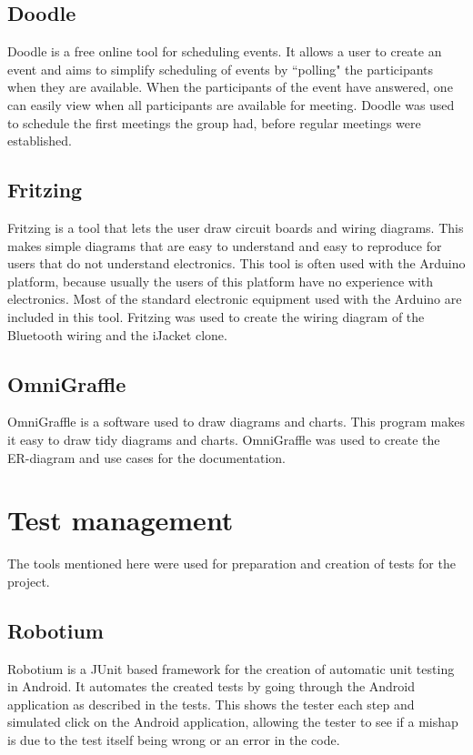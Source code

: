 \subsection{Doodle}
Doodle is a free online tool for scheduling events. It allows a user to create an event and aims to simplify scheduling of events by ``polling" the participants when they are available. When the participants of the event have answered, one can easily view when all participants are available for meeting. Doodle was used to schedule the first meetings the group had, before regular meetings were established.

\subsection{Fritzing}
Fritzing is a tool that lets the user draw circuit boards and wiring diagrams. This makes simple diagrams that are easy to understand and easy to reproduce for users that do not understand electronics. This tool is often used with the Arduino platform, because usually the users of this platform have no experience with electronics. Most of the standard electronic equipment used with the Arduino are included in this tool. Fritzing was used to create the wiring diagram of the Bluetooth wiring and the iJacket clone.

\subsection{OmniGraffle}
OmniGraffle is a software used to draw diagrams and charts. This program makes it easy to draw tidy diagrams and charts. OmniGraffle was used to create the ER-diagram and use cases for the documentation.

\section{Test management}
The tools mentioned here were used for preparation and creation of tests for the project.

\subsection{Robotium}
Robotium is a JUnit based framework for the creation of automatic unit testing in Android. It automates the created tests by going through the Android application as described in the tests. This shows the tester each step and simulated click on the Android application, allowing the tester to see if a mishap is due to the test itself being wrong or an error in the code.